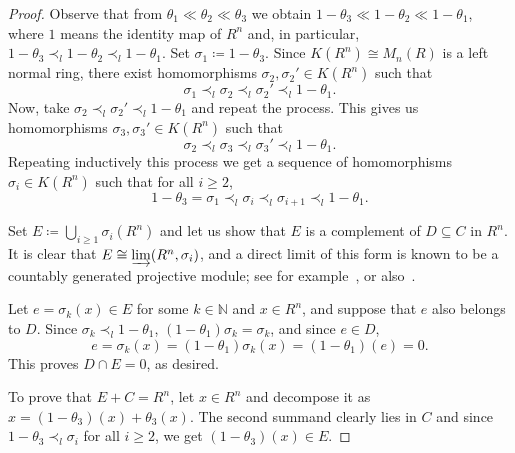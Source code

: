 \documentclass[11pt]{amsart}
\numberwithin{equation}{section}
\theoremstyle{definition}
\theoremstyle{plain}
\theoremstyle{definition}
\begin{document}
\begin{proof}
Observe that from $\theta_1 \ll \theta_2 \ll \theta_3$ we obtain $1 - \theta_3 \ll 1 - \theta_2 \ll 1 - \theta_1$, where $1$ means the identity map of $R^n$ and, in particular, $1 - \theta_3 \prec_l 1 - \theta_2 \prec_l 1 - \theta_1$. Set $\sigma_1 \coloneqq 1 - \theta_3$. Since $K(R^n) \cong M_n(R)$ is a left normal ring, there exist homomorphisms $\sigma_2, \sigma_2' \in K(R^n)$ such that 
\begin{equation*}
    \sigma_1 \prec_l \sigma_2 \prec_l \sigma_2' \prec_l 1 - \theta_1.
\end{equation*}
Now, take $\sigma_2 \prec_l \sigma_2' \prec_l 1 - \theta_1$ and repeat the process. This gives us homomorphisms $\sigma_3, \sigma_3' \in K(R^n)$ such that 
\begin{equation*}
    \sigma_2 \prec_l \sigma_3 \prec_l \sigma_3' \prec_l 1 - \theta_1.
\end{equation*}
Repeating inductively this process we get a sequence of homomorphisms $\sigma_i \in K(R^n)$ such that for all $i \geq 2$, 
\begin{equation*}
    1 - \theta_3= \sigma_1 \prec_l \sigma_i \prec_l \sigma_{i+1} \prec_l 1 - \theta_1.
\end{equation*}

Set $E \coloneqq \bigcup_{i \geq 1} \sigma_i(R^n)$ and let us show that $E$ is a complement of $D \subseteq C$ in $R^n$. It is clear that $E \cong \varinjlim (R^n, \sigma_i)$, and a direct limit of this form is known to be a countably generated projective module; see for example~\cite[Theorem 2.1]{Whitehead}, or also~\cite[Lemma 4.7]{AntAraBosPerVil25}. 

Let $e = \sigma_k(x) \in E$ for some $k \in \mathbb{N}$ and $x \in R^n$, and suppose that $e$ also belongs to $D$. Since $\sigma_k \prec_l 1 - \theta_1$, $(1 - \theta_1)\sigma_k = \sigma_k$, and since $e \in D$, 
\begin{equation*}
    e = \sigma_k(x) = (1 - \theta_1)\sigma_k(x) = (1 - \theta_1)(e) = 0.
\end{equation*}
This proves $D \cap E = 0$, as desired. 

To prove that $E + C = R^n$, let $x \in R^n$ and decompose it as $x = (1 - \theta_3)(x) + \theta_3(x)$. The second summand clearly lies in $C$ and since $1 - \theta_3 \prec_l \sigma_i$ for all $i\ge 2$, we get $(1 - \theta_3)(x) \in E$. 


\end{proof}
\end{document}
